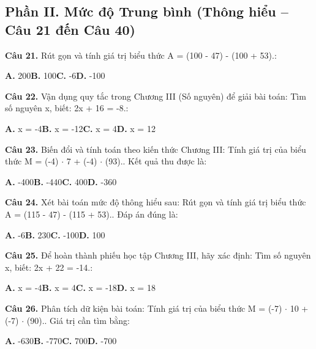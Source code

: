 \documentclass[11pt,a4paper]{article}
\begin{document}
\subsection*{\color{accent} Phần II. Mức độ Trung bình (Thông hiểu -- Câu 21 đến Câu 40)}
\textbf{\color{primary} Câu 21.} Rút gọn và tính giá trị biểu thức A = (100 - 47) - (100 + 53).:\par
\hspace*{1.5em}\textbf{A.} 200\quad\quad \textbf{B.} 100\quad\quad \textbf{C.} -6\quad\quad \textbf{D.} -100\par\vspace{2pt}
\textbf{\color{primary} Câu 22.} Vận dụng quy tắc trong Chương III (Số nguyên) để giải bài toán: Tìm số nguyên x, biết: 2x + 16 = -8.:\par
\hspace*{1.5em}\textbf{A.} x = -4\quad\quad \textbf{B.} x = -12\quad\quad \textbf{C.} x = 4\quad\quad \textbf{D.} x = 12\par\vspace{2pt}
\textbf{\color{primary} Câu 23.} Biến đổi và tính toán theo kiến thức Chương III: Tính giá trị của biểu thức M = (-4) $\cdot$ 7 + (-4) $\cdot$ (93).. Kết quả thu được là:\par
\hspace*{1.5em}\textbf{A.} -400\quad\quad \textbf{B.} -440\quad\quad \textbf{C.} 400\quad\quad \textbf{D.} -360\par\vspace{2pt}
\textbf{\color{primary} Câu 24.} Xét bài toán mức độ thông hiểu sau: Rút gọn và tính giá trị biểu thức A = (115 - 47) - (115 + 53).. Đáp án đúng là:\par
\hspace*{1.5em}\textbf{A.} -6\quad\quad \textbf{B.} 230\quad\quad \textbf{C.} -100\quad\quad \textbf{D.} 100\par\vspace{2pt}
\textbf{\color{primary} Câu 25.} Để hoàn thành phiếu học tập Chương III, hãy xác định: Tìm số nguyên x, biết: 2x + 22 = -14.:\par
\hspace*{1.5em}\textbf{A.} x = -4\quad\quad \textbf{B.} x = 4\quad\quad \textbf{C.} x = -18\quad\quad \textbf{D.} x = 18\par\vspace{2pt}
\textbf{\color{primary} Câu 26.} Phân tích dữ kiện bài toán: Tính giá trị của biểu thức M = (-7) $\cdot$ 10 + (-7) $\cdot$ (90).. Giá trị cần tìm bằng:\par
\hspace*{1.5em}\textbf{A.} -630\quad\quad \textbf{B.} -770\quad\quad \textbf{C.} 700\quad\quad \textbf{D.} -700\par\vspace{2pt}
\end{document}
